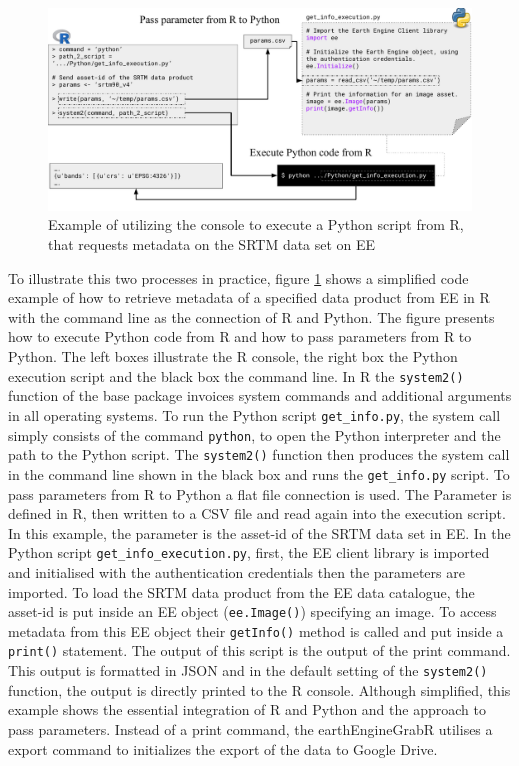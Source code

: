 \begin{center}
	\begin{figure}[h]
		\begin{center}
			\includegraphics[width=15cm]{images/concole_connection_big-cropped.pdf}
			\caption{Example of utilizing the console to execute a Python script from R, that requests metadata on the SRTM data set on EE}
			\label{consoleConnection}			
		\end{center}
	\end{figure}
\end{center}


To illustrate this two processes in practice, figure \ref{consoleConnection} shows a simplified code example of how to retrieve metadata of a specified data product from EE in R with the command line as the connection of R and Python. The figure presents how to execute Python code from R and how to pass parameters from R to Python. The left boxes illustrate the R console, the right box the Python execution script and the black box the command line.
In R the \texttt{system2()} function of the base package invoices system commands and additional arguments in all operating systems. 
To run the Python script \texttt{get\_info.py}, the system call simply consists of the command \texttt{python}, to open the Python interpreter and the path to the Python script. The \texttt{system2()} function then produces the system call in the command line shown in the black box and runs the \texttt{get\_info.py} script. To pass parameters from R to Python a flat file connection is used. The Parameter is defined in R, then written to a CSV file and read again into the execution script. In this example, the parameter is the asset-id of the SRTM data set in EE. 
In the Python script \texttt{get\_info\_execution.py}, first, the EE client library is imported and initialised with the authentication credentials then the parameters are imported. To load the SRTM data product from the EE data catalogue, the asset-id is put inside an EE object (\texttt{ee.Image()}) specifying an image. To access metadata from this EE object their \texttt{getInfo()} method is called and put inside a \texttt{print()} statement. The output of this script is the output of the print command. This output is formatted in JSON and in the default setting of the \texttt{system2()} function, the output is directly printed to the R console. Although simplified, this example shows the essential integration of R and Python and the approach to pass parameters. 
Instead of a print command, the earthEngineGrabR utilises a export command to initializes the export of the data to Google Drive.

